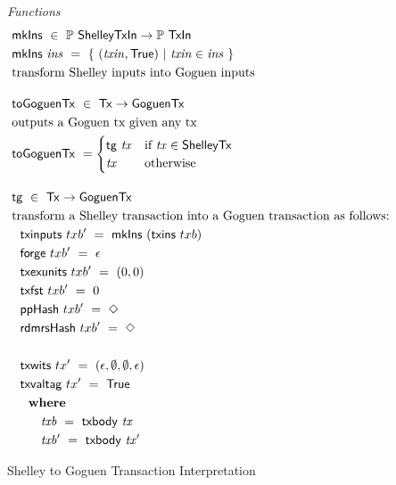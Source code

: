 \begin{figure}[htb]
  \emph{Functions}
  \begin{align*}
      & \fun{mkIns} ~\in~ \powerset{\ShelleyTxIn} \to \powerset{\TxIn}  \\
      & \fun{mkIns}~\var{ins} ~=~ \{~ (\var{txin}, \True) ~\vert~
      \var{txin} \in \var{ins}~\} \\
      & \text{transform Shelley inputs into Goguen inputs}
      \nextdef
      & \fun{toGoguenTx} ~\in~  \Tx \to \GoguenTx \\
      & \text{outputs a Goguen tx given any tx} \\
      & \fun{toGoguenTx} ~=
          \begin{cases}
           \fun{tg}~\var{tx}  & \text{if~} \var{tx} \in \ShelleyTx \\
                \var{tx} & \text{otherwise}
              \end{cases}
      \nextdef
      & \fun{tg} ~\in~  \Tx \to \GoguenTx \\
      & \text{transform a Shelley transaction into a Goguen transaction as follows:} \\
      & ~~\fun{txinputs}~{txb'} ~=~ \fun{mkIns}~(\fun{txins}~{txb}) \\
      & ~~\fun{forge}~{txb'} ~= ~\epsilon \\
      & ~~\fun{txexunits}~{txb'} ~= ~(0,0) \\
      & ~~\fun{txfst}~{txb'} ~= ~0 \\
      & ~~\fun{ppHash}~{txb'} ~= ~\Nothing \\
      & ~~\fun{rdmrsHash}~{txb'} ~= ~\Nothing \\~\\
      & ~~\fun{txwits}~{tx'} ~= ~(\epsilon,\emptyset,\emptyset,\epsilon) \\
      & ~~\fun{txvaltag}~{tx'} ~= ~\True \\
      &~~      \where \\
      & ~~~~~~~ \var{txb}~=~\txbody{tx} \\
      & ~~~~~~~ \var{txb'}~=~\txbody{tx'}
  \end{align*}
  \caption{Shelley to Goguen Transaction Interpretation}
  \label{fig:functions:to-shelley}
\end{figure}
